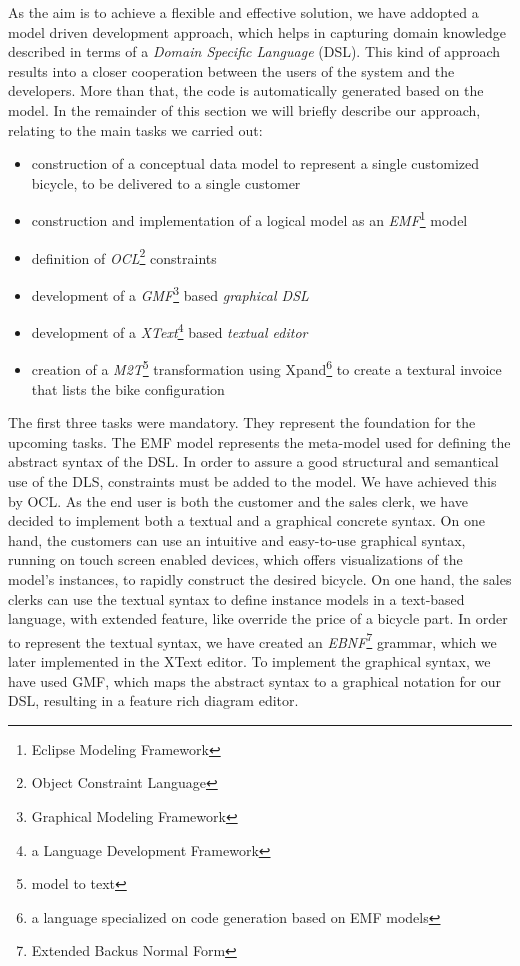 \noindent As the aim is to achieve a flexible and effective solution, we have
addopted a model driven development approach, which helps in capturing domain
knowledge described in terms of a \emph{Domain Specific Language} (DSL). This
kind of approach results into a closer cooperation between the users of the
system and the developers. More than that, the code is automatically generated
based on the model. In the remainder of this section we will briefly describe
our approach, relating to the main tasks we carried out:
\begin{itemize}
  \item construction of a conceptual data model to represent a single customized
  bicycle, to be delivered to a single customer
  \item construction and implementation of a logical model as an
  \emph{EMF}\footnote{Eclipse Modeling Framework} model
  \item definition of \emph{OCL}\footnote{Object Constraint Language}
  constraints
  \item development of a \emph{GMF}\footnote{Graphical Modeling Framework} based
  \emph{graphical DSL}
  \item development of a \emph{XText}\footnote{a Language Development Framework}
  based \emph{textual editor}
  \item creation of a \emph{M2T}\footnote{model to text} transformation using
  Xpand\footnote{a language specialized on code generation based on EMF models}
  to create a textural invoice that lists the bike configuration
\end{itemize} 

\noindent The first three tasks were mandatory. They represent the foundation
for the upcoming tasks. The EMF model represents the meta-model used for
defining the abstract syntax of the DSL. In order to assure a good structural
and semantical use of the DLS, constraints must be added to the model. We have
achieved this by OCL. As the end user is both the customer and the sales clerk,
we have decided to implement both a textual and a graphical concrete syntax. On
one hand, the customers can use an intuitive and easy-to-use graphical
syntax, running on touch screen enabled devices, which offers visualizations
of the model's instances, to rapidly construct the desired bicycle. On one hand,
the sales clerks can use the textual syntax to define instance models in a text-based language, with extended feature, like
override the price of a bicycle part. In order to represent the textual syntax,
we have created an \emph{EBNF}\footnote{Extended Backus Normal
Form} grammar, which we later implemented in the XText editor. To implement the
graphical syntax, we have used GMF, which maps the abstract syntax to a
graphical notation for our DSL, resulting in a feature rich diagram editor.\\

